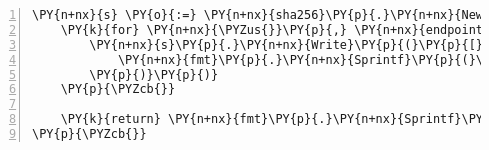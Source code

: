 \begin{Verbatim}[commandchars=\\\{\},numbers=left,firstnumber=1,stepnumber=1,frame=single]
	\PY{n+nx}{s} \PY{o}{:=} \PY{n+nx}{sha256}\PY{p}{.}\PY{n+nx}{New}\PY{p}{(}\PY{p}{)}
	\PY{k}{for} \PY{n+nx}{\PYZus{}}\PY{p}{,} \PY{n+nx}{endpoint} \PY{o}{:=} \PY{k}{range} \PY{n+nx}{endpoints} \PY{p}{\PYZob{}}
		\PY{n+nx}{s}\PY{p}{.}\PY{n+nx}{Write}\PY{p}{(}\PY{p}{[}\PY{p}{]}\PY{n+nb}{byte}\PY{p}{(}
			\PY{n+nx}{fmt}\PY{p}{.}\PY{n+nx}{Sprintf}\PY{p}{(}\PY{l+s}{\PYZdq{}\PYZpc{}v\PYZdq{}}\PY{p}{,} \PY{n+nx}{endpoint}\PY{p}{.}\PY{n+nx}{GetHashString}\PY{p}{(}\PY{p}{)}\PY{p}{)}
		\PY{p}{)}\PY{p}{)}
	\PY{p}{\PYZcb{}}

	\PY{k}{return} \PY{n+nx}{fmt}\PY{p}{.}\PY{n+nx}{Sprintf}\PY{p}{(}\PY{l+s}{\PYZdq{}\PYZpc{}x\PYZdq{}}\PY{p}{,} \PY{n+nx}{s}\PY{p}{.}\PY{n+nx}{Sum}\PY{p}{(}\PY{k+kc}{nil}\PY{p}{)}\PY{p}{)}
\PY{p}{\PYZcb{}}
\end{Verbatim}

